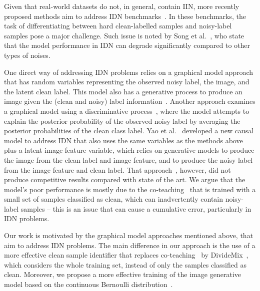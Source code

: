 \documentclass[10pt,twocolumn,letterpaper]{article}
\begin{document}
Given that real-world datasets do not, in general, contain IIN, more recently proposed methods aim to address IDN benchmarks~\cite{cheng2022instance, xia2020part, Zhu_2021_CVPR, berthon2021confidence, yao2021instance, liu2021understanding}. 
In these benchmarks, the task of differentiating between hard clean-labelled samples and noisy-label samples pose a major challenge.
Such issue is noted by Song et al.~\cite{song2019does}, who state that the model performance in IDN can degrade significantly compared to other types of noises. 


One direct way of addressing IDN problems relies on a graphical model approach that has random variables representing the observed noisy label, the image, and the latent clean label.
This model also has a generative process to produce an image given the (clean and noisy) label information~\cite{lawrence2001estimating}. Another approach examines a graphical model using a discriminative process~\cite{raykar2010learning},  where the model attempts to explain the posterior probability of the observed noisy label by averaging the posterior probabilities of the clean class label. 
Yao et al.~\cite{yao2021instance} developed a new causal model to address IDN that also uses the same variables as the methods above plus a latent image feature variable, which relies on  generative models to produce the image from the clean label and image feature, and to produce the noisy label from the image feature and clean label.
That approach~\cite{yao2021instance}, however, did not produce competitive results compared with state of the art.
We argue that the model's poor performance is mostly due to the co-teaching~\cite{han2018co} that is trained with a small set of samples classified as clean, which can inadvertently contain noisy-label samples -- this is an issue that can cause a cumulative error, particularly in IDN problems.



Our work is motivated by the graphical model approaches mentioned above, that aim to address IDN problems. 
The main difference in our approach is the use of a more effective clean sample identifier that replaces  co-teaching~\cite{yao2021instance} by DivideMix~\cite{li2020dividemix}, which considers the whole training set, instead of only the samples classified as clean.
Moreover, we propose a more effective training of the image generative model based on the continuous Bernoulli distribution~\cite{loaiza2019continuous}. 
\end{document}
